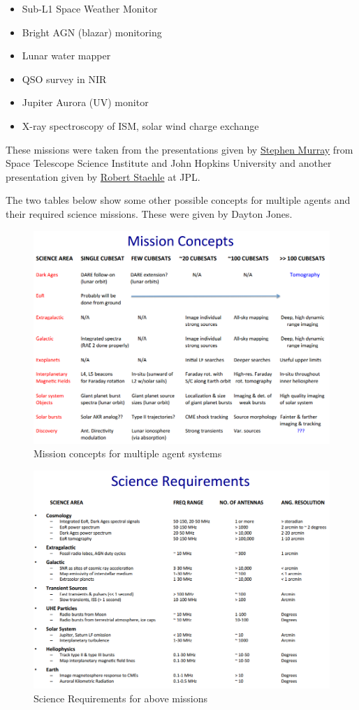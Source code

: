 \documentclass[11pt,a4paper]{report}
\begin{document}
\begin{itemize}
\item Sub-L1 Space Weather Monitor 
\item Bright AGN (blazar) monitoring
\item Lunar water mapper
\item QSO survey in NIR
\item Jupiter Aurora (UV) monitor
\item X-ray spectroscopy of ISM, solar wind charge exchange
\end{itemize}

These missions were taken from the presentations given by \href{http://kiss.caltech.edu/workshops/smallsat2012/presentations/murray.pdf}{Stephen Murray} from Space Telescope Science Institute and John Hopkins University and another presentation given by \href{http://kiss.caltech.edu/cosponsored/cubesat2012/presentations/staehle-interplanetary-cubesat-missions.pdf}{Robert Staehle} at JPL. 

The two tables below show some other possible concepts for multiple agents and their required science missions. These were given by Dayton Jones. 


\begin{figure}[!ht]
\includegraphics[scale=0.7]{mission_concepts.png}
\caption{Mission concepts for multiple agent systems}
\end{figure}

\begin{figure}[!ht]
\includegraphics[scale=0.7]{science_req.png}
\caption{Science Requirements for above missions}
\end{figure}

%
%
\end{document}
